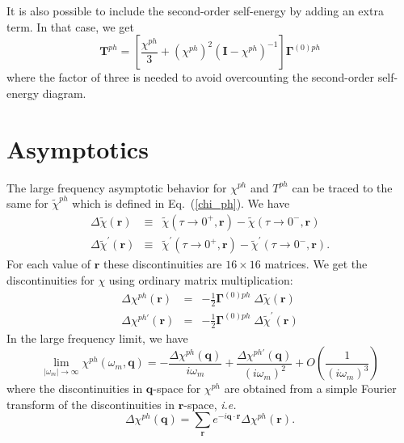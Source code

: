 It is also possible to include the second-order self-energy by
adding an extra term.  In that case, we get
\begin{equation}
\label{tph_def}
\mathbf{T}^{ph} = \left[\frac{\chi^{ph}}{3} +  
(\chi^{ph})^2 (\mathbf{I} - \chi^{ph})^{-1} \right]
\mathbf{\Gamma}^{(0)ph}
\end{equation}
where the factor of three is needed to avoid overcounting the
second-order self-energy diagram.

\section{Asymptotics}
The large frequency asymptotic behavior for $\chi^{ph}$ and
$T^{ph}$ can be traced to the same
for $\tilde{\chi}^{ph}$ which is defined in Eq.~(\ref{chi_ph}).
We have 
\begin{eqnarray}
\Delta \tilde{\chi}(\mathbf{r}) & \equiv &
\tilde{\chi}(\tau \to 0^+,\mathbf{r}) -
\tilde{\chi}(\tau \to 0^-,\mathbf{r}) \\
\Delta \tilde{\chi}^{\prime}(\mathbf{r}) & \equiv &
\tilde{\chi}^{\prime}(\tau \to 0^+,\mathbf{r}) -
\tilde{\chi}^{\prime}(\tau \to 0^-,\mathbf{r}).  
\end{eqnarray}
For each value of $\mathbf{r}$ these discontinuities are 
$16 \times 16$ matrices.
We get the discontinuities for $\chi$ using ordinary 
matrix multiplication:
\begin{eqnarray}
\Delta \chi^{ph}(\mathbf{r}) & = &
-\frac{1}{2} \mathbf{\Gamma}^{(0)ph}\;\Delta \tilde{\chi}(\mathbf{r}) \\
\Delta \chi^{ph \prime}(\mathbf{r}) & = &
-\frac{1}{2}\mathbf{\Gamma}^{(0)ph}\;\Delta \tilde{\chi}^{\prime}(\mathbf{r}) 
\end{eqnarray}
In the large frequency limit, we have
\begin{equation}
\label{kph_asy}
\lim_{|\omega_m| \to \infty}
\chi^{ph}(\omega_m, \mathbf{q})
= - \frac{\Delta \chi^{ph}(\mathbf{q})}{i \omega_m}
+ \frac{\Delta \chi^{ph \prime}(\mathbf{q})}{(i \omega_m)^2}
+ O \left( \frac{1}{(i \omega_m)^3} \right)
\end{equation}
where the discontinuities in $\mathbf{q}$-space for
$\chi^{ph}$ are obtained from a simple Fourier transform
of the discontinuities in $\mathbf{r}$-space, \textit{i.e.}
\begin{equation}
\Delta \chi^{ph}(\mathbf{q}) = \sum_{\mathbf{r}}
e^{-i \mathbf{q}\cdot\mathbf{r}}\Delta \chi^{ph}(\mathbf{r}).
\end{equation} 

